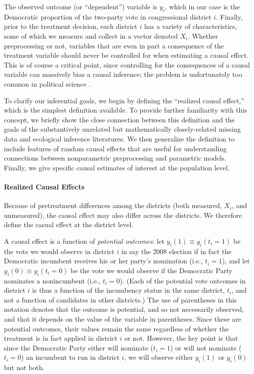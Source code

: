 \documentclass[11pt,titlepage]{article}
\begin{document}
The observed outcome (or ``dependent'') variable is $y_i$, which in
our case is the Democratic proportion of the two-party vote in
congressional district $i$.  Finally, prior to the treatment decision,
each district $i$ has a variety of characteristics, some of which we
measure and collect in a vector denoted $X_i$.  Whether preprocessing
or not, variables that are even in part a consequence of the treatment
variable should never be controlled for when estimating a causal
effect.  This is of course a critical point, since controlling for the
consequences of a causal variable can massively bias a causal
inference; the problem is unfortunately too common in political
science \citep{KinZen04}.

To clarify our inferential goals, we begin by defining the ``realized
causal effect,'' which is the simplest definition available.  To
provide further familiarity with this concept, we briefly show the
close connection between this definition and the goals of the
substantively unrelated but mathematically closely-related missing
data and ecological inference literatures.  We then generalize the
definition to include features of random causal effects that are
useful for understanding connections between nonparametric
preprocessing and parametric models.  Finally, we give specific causal
estimates of interest at the population level.

\paragraph{Realized Causal Effects}
Because of pretreatment differences among the districts (both
measured, $X_i$, and unmeasured), the causal effect may also differ
across the districts.  We therefore define the casual effect at the
district level.

A causal effect is a function of \emph{potential outcomes}: let
$y_i(1)\equiv y_i(t_i=1)$ be the vote we would observe in district $i$
in say the 2008 election if in fact the Democratic incumbent receives
his or her party's nomination (i.e., $t_i=1$), and let $y_i(0)\equiv
y_i(t_i=0)$ be the vote we would observe if the Democratic Party
nominates a nonincumbent (i.e., $t_i=0$).  (Each of the potential vote
outcomes in district $i$ is thus a function of the incumbency status
in the same district, $t_i$, and not a function of candidates in other
districts.)  The use of parentheses in this notation denotes that the
outcome is potential, and so not necessarily observed, and that it
depends on the value of the variable in parentheses.  Since these are
potential outcomes, their values remain the same regardless of whether
the treatment is in fact applied in district $i$ or not.  However, the
key point is that since the Democratic Party either will nominate
($t_i=1$) or will not nominate ($t_i=0$) an incumbent to run in
district $i$, we will observe either $y_{i}(1)$ or $y_{i}(0)$ but not
both.
\end{document}
